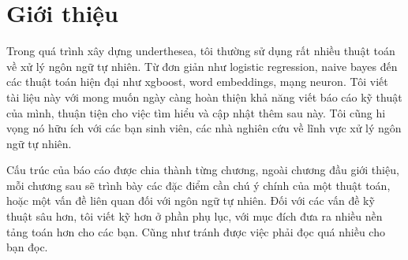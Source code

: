 \section{Giới thiệu}

Trong quá trình xây dựng underthesea, tôi thường sử dụng rất nhiều thuật toán về xử lý ngôn ngữ tự nhiên.
Từ đơn giản như logistic regression, naive bayes đến các thuật toán hiện đại như xgboost, word embeddings, mạng neuron.
Tôi viết tài liệu này với mong muốn ngày càng hoàn thiện khả năng viết báo cáo kỹ thuật của mình, thuận tiện cho việc tìm hiểu và cập nhật thêm sau này.
Tôi cũng hi vọng nó hữu ích với các bạn sinh viên, các nhà nghiên cứu về lĩnh vực xử lý ngôn ngữ tự nhiên.

Cấu trúc của báo cáo được chia thành từng chương, ngoài chương đầu giới thiệu, mỗi chương sau sẽ trình bày các đặc điểm cần chú ý chính của  một thuật toán, hoặc một vấn đề liên quan đối với ngôn ngữ tự nhiên.
Đối với các vấn đề kỹ thuật sâu hơn, tôi viết kỹ hơn ở phần phụ lục, với mục đích đưa ra nhiều nền tảng toán hơn cho các bạn. Cũng như tránh được việc phải đọc quá nhiều cho bạn đọc.